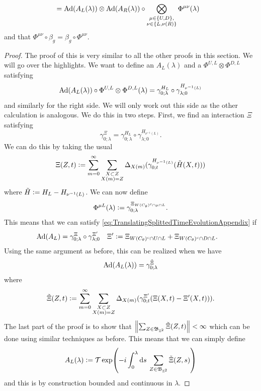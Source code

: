 \documentclass[11pt,a4paper,twoside]{article}
\numberwithin{equation}{section}
\begin{document}
{\begin{lemma}
\begin{align}
			\label{eq:TranslatingSplittedTimeEvolutionAppendix}
			&=\Ad{A_L(\lambda)}\otimes\Ad{A_R(\lambda)}\circ\bigotimes_{\substack{\mu\in\{U,D\},\\\nu\in\{L,\nu(R)\}}}\Phi^{\mu\nu}(\lambda)
		\end{align}
		and that $\Phi^{\mu\nu}\circ\beta_g=\beta_g\circ\Phi^{\mu\nu}$.
	\end{lemma}
	\begin{proof}
		The proof of this is very similar to all the other proofs in this section. We will go over the highlights. We want to define an $A_L(\lambda)$ and a $\Phi^{U,L}\otimes\Phi^{D,L}$ satisfying
		\begin{equation}
			\Ad{A_L(\lambda)}\circ\Phi^{U,L}\otimes\Phi^{D,L}(\lambda)=\gamma^{H_L}_{0;\lambda}\circ\gamma^{H_{\nu^{-1}(L)}}_{\lambda;0}
		\end{equation}
		and similarly for the right side. We will only work out this side as the other calculation is analogous. We do this in two steps. First, we find an interaction $\Xi$ satisfying
		\begin{equation}
			\gamma^\Xi_{0;\lambda}=\gamma^{H_L}_{0;\lambda}\circ\gamma^{H_{\nu^{-1}(L)}}_{\lambda;0}.
		\end{equation}
		We can do this by taking the usual
		\begin{equation}
			\Xi(Z,t)\vcentcolon= \sum_{m=0}^{\infty}\sum_{\substack{X\subset Z\\X(m)=Z}}\Delta_{X(m)}(\gamma^{H_{\nu^{-1}(L)}}_{0;t}(\tilde{H}(X,t)))
		\end{equation}
		where $\tilde{H}\vcentcolon= H_L-H_{\nu^{-1}(L)}$. We can now define
		\begin{equation}
			\Phi^{\mu L}(\lambda)\vcentcolon=\gamma^{\Xi_{W(C_\theta)^c\cap\mu\cap L}}_{0;\lambda}.
		\end{equation}
		This means that we can satisfy \ref{eq:TranslatingSplittedTimeEvolutionAppendix} if
		\begin{align}
			\Ad{A_L}&=\gamma^{\Xi}_{0;\lambda}\circ\gamma^{\Xi'}_{\lambda;0}&\Xi'&\defeq \Xi_{W(C_\theta)^c\cap U\cap L}+\Xi_{W(C_\theta)^c\cap D\cap L}.
		\end{align}
		Using the same argument as before, this can be realized when we have
		\begin{equation}
			\Ad{A_L(\lambda)}=\gamma^{\tilde\Xi}_{0;\lambda}
		\end{equation}
		where
		\begin{equation}
			\tilde\Xi(Z,t)\vcentcolon= \sum_{m=0}^{\infty}\sum_{\substack{X\subset Z\\X(m)=Z}}\Delta_{X(m)}(\gamma^{\Xi'}_{0;t}(\Xi(X,t)-\Xi'(X,t))).
		\end{equation}
		The last part of the proof is to show that $\norm{\sum_{Z\in\mathfrak{B}_{\mathbb Z^2}}\tilde\Xi(Z,t)}<\infty$ which can be done using similar techniques as before. This means that we can simply define
		\begin{equation}
			A_L(\lambda)\vcentcolon=\mathcal{T}\exp(-i\int_0^\lambda \text{d} s\: \sum_{Z\in \mathfrak{B}_{\mathbb Z^2}}\tilde{\Xi}(Z,s))
		\end{equation}
		and this is by construction bounded and continuous in $\lambda$.
	\end{proof}
	}{}
	
	
	
\end{document}
